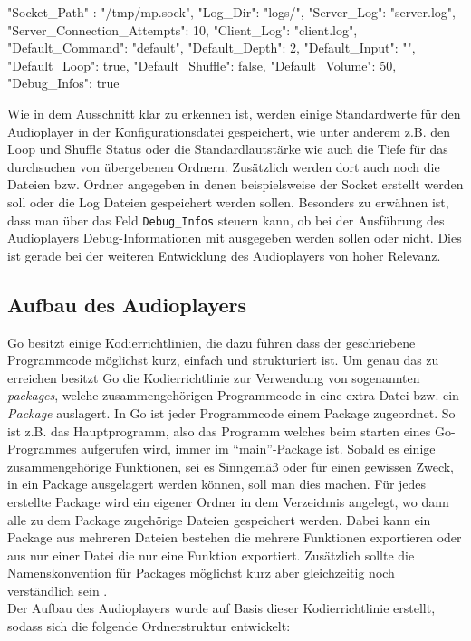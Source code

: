 \begin{jsonlisting}
{
"Socket_Path" : "/tmp/mp.sock",
"Log_Dir": "logs/",
"Server_Log": "server.log",
"Server_Connection_Attempts": 10,
"Client_Log": "client.log",
"Default_Command": "default",
"Default_Depth": 2,
"Default_Input": "",
"Default_Loop": true,
"Default_Shuffle": false,
"Default_Volume": 50,
"Debug_Infos": true
}
\end{jsonlisting}

Wie in dem Ausschnitt klar zu erkennen ist, werden einige Standardwerte für den Audioplayer in der Konfigurationsdatei gespeichert, wie unter anderem z.B. den Loop und Shuffle Status oder die Standardlautstärke wie auch die Tiefe für das durchsuchen von übergebenen Ordnern. Zusätzlich werden dort auch noch die Dateien bzw. Ordner angegeben in denen beispielsweise der Socket erstellt werden soll oder die Log Dateien gespeichert werden sollen. Besonders zu erwähnen ist, dass man über das Feld \verb|Debug_Infos| steuern kann, ob bei der Ausführung des Audioplayers Debug-Informationen mit ausgegeben werden sollen oder nicht. Dies ist gerade bei der weiteren Entwicklung des Audioplayers von hoher Relevanz.

\subsection{Aufbau des Audioplayers}
Go besitzt einige Kodierrichtlinien, die dazu führen dass der geschriebene Programmcode möglichst kurz, einfach und strukturiert ist. Um genau das zu erreichen besitzt Go die Kodierrichtlinie zur Verwendung von sogenannten \textit{packages}, welche zusammengehörigen Programmcode in eine extra Datei bzw. ein \textit{Package} auslagert. In Go ist jeder Programmcode einem Package zugeordnet. So ist z.B. das Hauptprogramm, also das Programm welches beim starten eines Go-Programmes aufgerufen wird, immer im \enquote{main}-Package ist. Sobald es einige zusammengehörige Funktionen, sei es Sinngemäß oder für einen gewissen Zweck, in ein Package ausgelagert werden können, soll man dies machen. Für jedes erstellte Package wird ein eigener Ordner in dem Verzeichnis angelegt, wo dann alle zu dem Package zugehörige Dateien gespeichert werden. Dabei kann ein Package aus mehreren Dateien bestehen die mehrere Funktionen exportieren oder aus nur einer Datei die nur eine Funktion exportiert. Zusätzlich sollte die Namenskonvention für Packages möglichst kurz aber gleichzeitig noch verständlich sein \autocite{crawshaw_2019}. \\
Der Aufbau des Audioplayers wurde auf Basis dieser Kodierrichtlinie erstellt, sodass sich die folgende Ordnerstruktur entwickelt:

